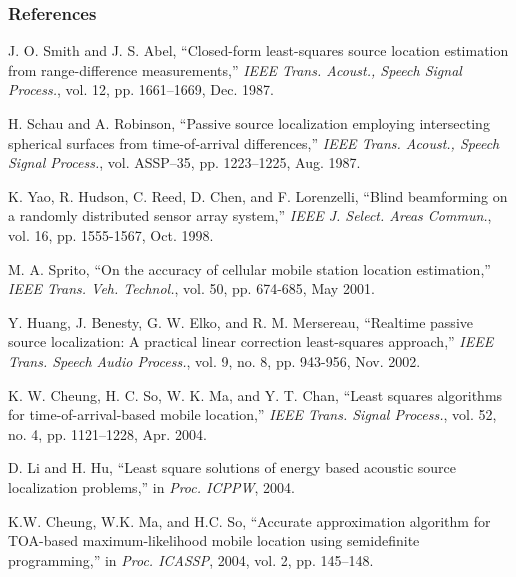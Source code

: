 




\begin{frame} [t,allowframebreaks]
\frametitle{References}

%

\begin{thebibliography}{99} 

J. O. Smith and J. S. Abel, ``Closed-form least-squares source location
estimation from range-difference measurements,'' {\em IEEE Trans. Acoust.,
Speech Signal Process.}, vol. 12, pp. 1661--1669, Dec. 1987.

H. Schau and A. Robinson, ``Passive source localization employing intersecting spherical surfaces from time-of-arrival differences,'' {\em IEEE Trans. Acoust., Speech Signal Process.}, vol. ASSP--35, pp. 1223--1225, Aug. 1987.

K. Yao, R. Hudson, C. Reed, D. Chen, and F. Lorenzelli, ``Blind beamforming on a randomly distributed sensor array system,'' {\em IEEE J. Select. Areas Commun.}, vol. 16, pp. 1555-1567, Oct. 1998.

M. A. Sprito, ``On the accuracy of cellular mobile station location estimation,'' {\em IEEE Trans. Veh. Technol.}, vol. 50, pp. 674-685, May 2001.

Y. Huang, J. Benesty, G. W. Elko, and R. M. Mersereau, ``Realtime passive source localization: A practical linear correction least-squares approach,'' {\em IEEE Trans. Speech Audio Process.}, vol. 9, no. 8, pp. 943-956, Nov. 2002.

K. W. Cheung, H. C. So, W. K. Ma, and Y. T. Chan, ``Least squares algorithms for time-of-arrival-based mobile location,'' {\em IEEE Trans. Signal Process.}, vol. 52, no. 4, pp. 1121--1228, Apr. 2004.

D. Li and H. Hu, ``Least square solutions of energy based acoustic source localization problems,'' in {\em Proc. ICPPW}, 2004.

K.W. Cheung, W.K. Ma, and H.C. So, ``Accurate approximation algorithm for TOA-based maximum-likelihood mobile location using semidefinite programming,'' in {\em Proc. ICASSP}, 2004, vol. 2, pp. 145--148.


\end{thebibliography}
\end{frame}

